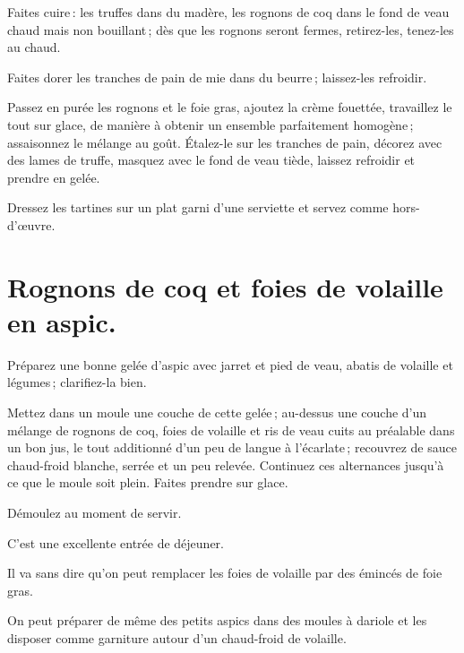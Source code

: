 Faites cuire : les truffes dans du madère, les rognons de coq dans le fond de
veau chaud mais non bouillant ; dès que les rognons seront fermes, retirez-les,
tenez-les au chaud.

Faites dorer les tranches de pain de mie dans du beurre ; laissez-les refroidir.

Passez en purée les rognons et le foie gras, ajoutez la crème fouettée,
travaillez le tout sur glace, de manière à obtenir un ensemble parfaitement
homogène ; assaisonnez le mélange au goût. Étalez-le sur les tranches de pain,
décorez avec des lames de truffe, masquez avec le fond de veau tiède, laissez
refroidir et prendre en gelée.

Dressez les tartines sur un plat garni d'une serviette et servez comme
hors-d'œuvre.

\section*{\centering Rognons de coq et foies de volaille en aspic.}
{}

Préparez une bonne gelée d'aspic avec jarret et pied de veau, abatis de
volaille et légumes ; clarifiez-la bien.

Mettez dans un moule une couche de cette gelée ; au-dessus une couche d'un
mélange de rognons de coq, foies de volaille et ris de veau cuits au préalable
dans un bon jus, le tout additionné d'un peu de langue à l'écarlate ; recouvrez
de sauce chaud-froid blanche, serrée et un peu relevée. Continuez ces
alternances jusqu'à ce que le moule soit plein. Faites prendre sur glace.

Démoulez au moment de servir.

C'est une excellente entrée de déjeuner.

\sk

Il va sans dire qu'on peut remplacer les foies de volaille par des émincés de
foie gras.

\sk

On peut préparer de même des petits aspics dans des moules à dariole et les
disposer comme garniture autour d'un chaud-froid de volaille.

